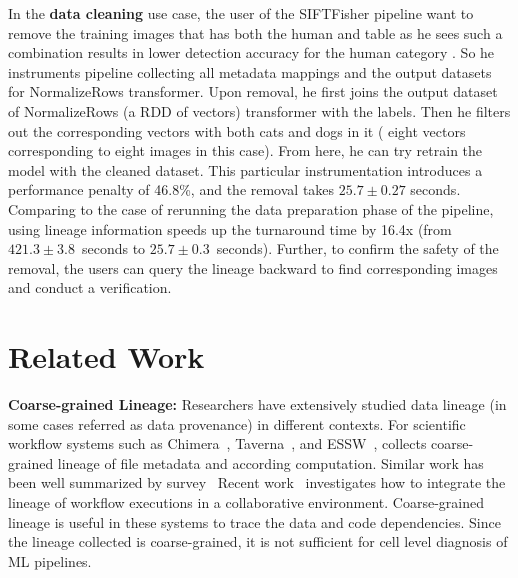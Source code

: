 \documentclass{sig-alternate}
\begin{document}
In the {\bf data cleaning} use case, the user of the SIFTFisher pipeline want to remove the training images that has both the human and table as
he sees such a combination results in lower detection accuracy for the human category .
So he instruments pipeline collecting all metadata mappings and the output datasets for NormalizeRows transformer. 
Upon removal, he first joins the output dataset of NormalizeRows (a RDD of vectors) transformer with the labels.
Then he filters out the corresponding vectors with both cats and dogs in it ( eight vectors corresponding to eight images in this case). 
From here, he can try retrain the model with the cleaned dataset. 
This particular instrumentation introduces a performance penalty of 46.8\%, and the removal takes $25.7\pm0.27$ seconds.
Comparing to the case of rerunning the data preparation phase of the pipeline, using lineage information speeds up the turnaround
time by 16.4x (from $421.3\pm3.8$~seconds to $25.7\pm0.3$~seconds). 
Further, to confirm the safety of the removal, the users can query the lineage backward to find corresponding 
images and conduct a verification.

\section{Related Work}
\label{sec:Related}
{\bf Coarse-grained Lineage:} Researchers have extensively studied data lineage (in some cases referred as data provenance) in different contexts.
For scientific workflow systems such as  Chimera~\cite{foster02}, Taverna~\cite{oinn02}, and ESSW~\cite{frew01}, 
collects coarse-grained lineage of file metadata and according computation. 
Similar work has been well summarized by survey~\cite{simmhan05, freire08, bose05}
Recent work~\cite{altintas10} investigates how to integrate the lineage of workflow executions
in a collaborative environment. Coarse-grained lineage is useful in these systems to trace the data and code dependencies.
Since the lineage collected is coarse-grained, it is not sufficient for cell level diagnosis of ML pipelines.
\end{document}
